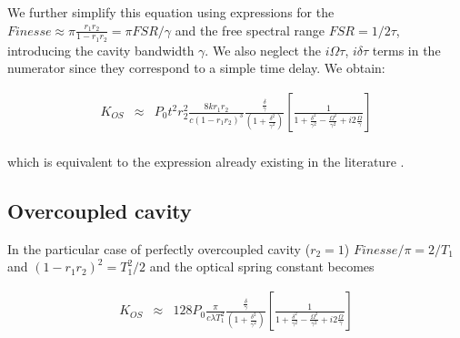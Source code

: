 We further simplify this equation using expressions for the $Finesse \approx \pi \frac{r_1r_2}{1-r_1r_2}= \pi FSR/\gamma$ and the free spectral range $FSR=1/2\tau$, introducing  the cavity bandwidth $\gamma$. We also neglect the $i\Omega\tau$, $i\delta\tau$ terms in the numerator since they correspond to a simple time delay. We obtain:

\begin{align}
K_{OS} & \approx & P_0 t^2 r_2^2 \frac{8k r_1r_2}{c(1-r_1r_2)^3}\frac{ \frac{\delta}{\gamma}}{(1+\frac{\delta^2}{\gamma^2})} 
\left[\frac{1}{1+\frac{\delta^2}{\gamma^2}-\frac{\Omega^2}{\gamma^2}+i2\frac{\Omega}{\gamma} }\right]\nonumber\\
\end{align}

which is equivalent to the expression already existing in the literature \cite{Barginsky02,Corbitt07}.

\subsection{Overcoupled cavity}

In the particular case of perfectly overcoupled cavity ($r_2=1$) $Finesse/\pi=2/T_1$ and $(1-r_1r_2)^2=T_1^2/2$ and the optical spring constant becomes

\begin{align}
K_{OS} & \approx & 128 P_0  \frac{\pi}{c\lambda T_1^2}\frac{ \frac{\delta}{\gamma}}{(1+\frac{\delta^2}{\gamma^2})} 
\left[\frac{1}{1+\frac{\delta^2}{\gamma^2}-\frac{\Omega^2}{\gamma^2}+i2\frac{\Omega}{\gamma} }\right]\nonumber\\
\label{eqn:overcoupled}
\end{align}

